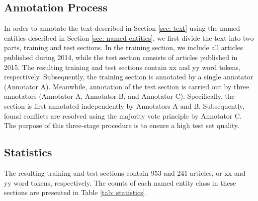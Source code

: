 \documentclass[11pt]{article}
\begin{document}





\subsection{Annotation Process}

In order to annotate the text described in Section \ref{sec: text} using the named entities described in Section \ref{sec: named entities}, we first divide the text into two parts, training and test sections. In the training section, we include all articles published during 2014, while the test section consists of articles published in 2015. The resulting training and test sections contain xx and yy word tokens, respectively. Subsequently, the training section is annotated by a single annotator (Annotator A). Meanwhile, annotation of the test section is carried out by three annotators (Annotator A, Annotator B, and Annotator C). Specifically, the section is first annotated independently by Annotators A and B. Subsequently, found conflicts are resolved using the majority vote principle by Annotator C. The purpose of this three-stage procedure is to ensure a high test set quality.



\subsection{Statistics}

The resulting training and test sections contain 953 and 241 articles, or xx and yy word tokens, respectively. The counts of each named entity class in these sections are presented in Table \ref{tab: statistics}.
\end{document}
